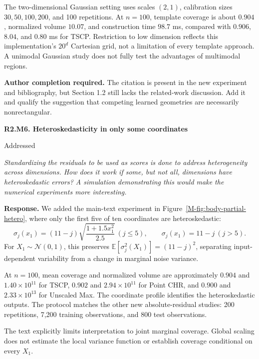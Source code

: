\documentclass[11pt]{article}
\newcommand{\msfig}[1]{Figure~\ref*{M-#1}}
\newcommand{\action}[1]{\par{\small\color{ActionRed}\textbf{Author completion required.} #1\par}}
\newcommand{\point}[3]{\par\Needspace{7\baselineskip}\medskip
\noindent\parbox[t]{0.77\linewidth}{\textbf{#1}}\hfill
\parbox[t]{0.21\linewidth}{\raggedleft\small\sffamily #2}\par\nopagebreak
{\color{ReviewerBlue}\small\itshape #3\par}\textbf{Response.} }
\begin{document}
The two-dimensional Gaussian setting uses scales $(2,1)$, calibration sizes $30,50,100,200$, and 100 repetitions. At $n=100$, template coverage is about $0.904$, normalized volume $10.07$, and construction time $98.7$ ms, compared with $0.906$, $8.04$, and $0.80$ ms for TSCP. Restriction to low dimension reflects this implementation's $20^d$ Cartesian grid, not a limitation of every template approach. A unimodal Gaussian study does not fully test the advantages of multimodal regions.

\action{The citation is present in the new experiment and bibliography, but Section 1.2 still lacks the related-work discussion. Add it and qualify the suggestion that competing learned geometries are necessarily nonrectangular.}

\point{R2.M6. Heteroskedasticity in only some coordinates}{Addressed}{Standardizing the residuals to be used as scores is done to address
heterogeneity across dimensions. How does it work if some, but not
all, dimensions have heteroskedastic errors? A simulation
demonstrating this would make the numerical experiments more
interesting.}
\label{response:R2.M6}
We added the main-text experiment in \msfig{fig:body-partial-hetero}, where only the first five of ten coordinates are heteroskedastic:
\[
 \sigma_j(x_1)=(11-j)\sqrt{\frac{1+1.5x_1^2}{2.5}}\ (j\leq5),
 \qquad \sigma_j(x_1)=11-j\ (j>5).
\]
For $X_1\sim\mathcal N(0,1)$, this preserves $\mathbb E[\sigma_j^2(X_1)]=(11-j)^2$, separating input-dependent variability from a change in marginal noise variance.

At $n=100$, mean coverage and normalized volume are approximately $0.904$ and $1.40\times10^{11}$ for TSCP, $0.902$ and $2.94\times10^{11}$ for Point CHR, and $0.900$ and $2.33\times10^{13}$ for Unscaled Max. The coordinate profile identifies the heteroskedastic outputs. The protocol matches the other new absolute-residual studies: 200 repetitions, 7,200 training observations, and 800 test observations.

The text explicitly limits interpretation to joint marginal coverage. Global scaling does not estimate the local variance function or establish coverage conditional on every $X_1$.
\end{document}
